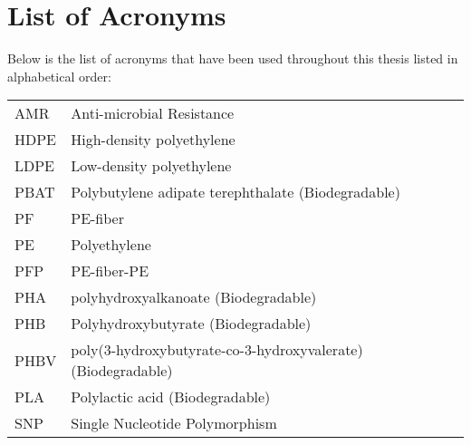\thispagestyle{plain}			%
\chapter*{List of Acronyms}
Below is the list of acronyms that have been used throughout this thesis listed in alphabetical order:
\vspace*{1.0cm}

\begin{tabular}{p{3cm}p{12cm}}
AMR & Anti-microbial Resistance \\
HDPE & High-density polyethylene \\
LDPE & Low-density polyethylene \\
PBAT & Polybutylene adipate terephthalate (Biodegradable) \\
PF & PE-fiber \\
PE & Polyethylene \\
PFP & PE-fiber-PE \\
PHA & polyhydroxyalkanoate (Biodegradable) \\
PHB & Polyhydroxybutyrate (Biodegradable) \\
PHBV & poly(3-hydroxybutyrate-co-3-hydroxyvalerate) (Biodegradable) \\
PLA & Polylactic acid (Biodegradable) \\
SNP & Single Nucleotide Polymorphism
\end{tabular}


\newpage				%
\thispagestyle{empty}
\mbox{}

